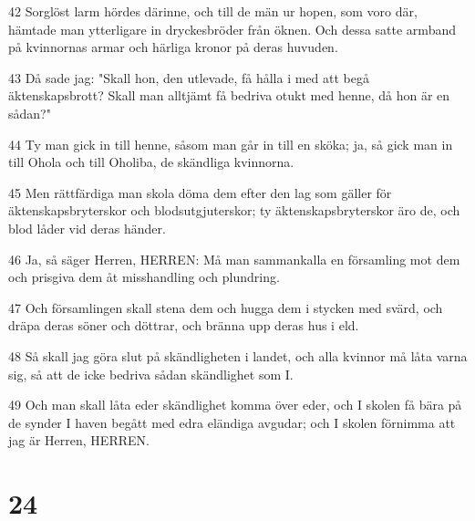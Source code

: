 \par 42 Sorglöst larm hördes därinne, och till de män ur hopen, som voro där, hämtade man ytterligare in dryckesbröder från öknen. Och dessa satte armband på kvinnornas armar och härliga kronor på deras huvuden.
\par 43 Då sade jag: "Skall hon, den utlevade, få hålla i med att begå äktenskapsbrott? Skall man alltjämt få bedriva otukt med henne, då hon är en sådan?"
\par 44 Ty man gick in till henne, såsom man går in till en sköka; ja, så gick man in till Ohola och till Oholiba, de skändliga kvinnorna.
\par 45 Men rättfärdiga man skola döma dem efter den lag som gäller för äktenskapsbryterskor och blodsutgjuterskor; ty äktenskapsbryterskor äro de, och blod låder vid deras händer.
\par 46 Ja, så säger Herren, HERREN: Må man sammankalla en församling mot dem och prisgiva dem åt misshandling och plundring.
\par 47 Och församlingen skall stena dem och hugga dem i stycken med svärd, och dräpa deras söner och döttrar, och bränna upp deras hus i eld.
\par 48 Så skall jag göra slut på skändligheten i landet, och alla kvinnor må låta varna sig, så att de icke bedriva sådan skändlighet som I.
\par 49 Och man skall låta eder skändlighet komma över eder, och I skolen få bära på de synder I haven begått med edra eländiga avgudar; och I skolen förnimma att jag är Herren, HERREN.

\chapter{24}


